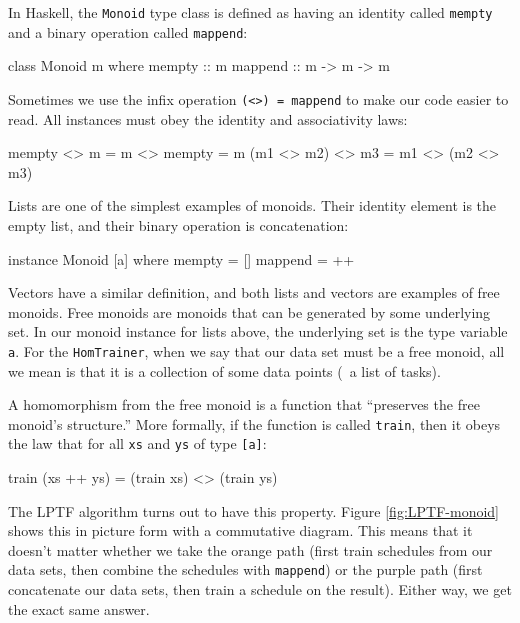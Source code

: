 \documentclass[tikz]{tmr}
\newcommand\h{\lstinline}
\newcommand\+{\mdoubleplus}
\begin{document}
In Haskell, the \h{Monoid} type class is defined as having an identity called \h{mempty} and a binary operation called \h{mappend}:
\begin{spec}
class Monoid m where
    mempty  :: m
    mappend :: m -> m -> m
\end{spec}
Sometimes we use the infix operation \h{(<>) = mappend} to make our code easier to read.
All instances must obey the identity and associativity laws:
\begin{spec}
mempty <> m = m <> mempty = m
(m1 <> m2) <> m3 = m1 <> (m2 <> m3)
\end{spec}
Lists are one of the simplest examples of monoids.
Their identity element is the empty list, and their binary operation is concatenation:
\begin{spec}
instance Monoid [a] where
    mempty = []
    mappend = ++
\end{spec}
Vectors have a similar definition, and both lists and vectors are examples of free monoids.
Free monoids are monoids that can be generated by some underlying set.
In our monoid instance for lists above, the underlying set is the type variable \h{a}.
For the \h{HomTrainer}, when we say that our data set must be a free monoid, all we mean is that it is a collection of some data points
(\eg\ a list of tasks).

A homomorphism from the free monoid is a function that ``preserves the free monoid's structure.''
More formally, if the function is called \h{train}, then it obeys the law that for all \lstinline{xs} and \lstinline{ys} of type \lstinline{[a]}:
\begin{spec}
train (xs ++ ys) = (train xs) <> (train ys)
\end{spec}
The LPTF algorithm turns out to have this property.
Figure \ref{fig:LPTF-monoid} shows this in picture form with a commutative diagram.
This means that it doesn't matter whether we take the orange path (first train schedules from our data sets, then combine the schedules with \h{mappend}) or the purple path (first concatenate our data sets, then train a schedule on the result).
Either way, we get the exact same answer.
\end{document}
